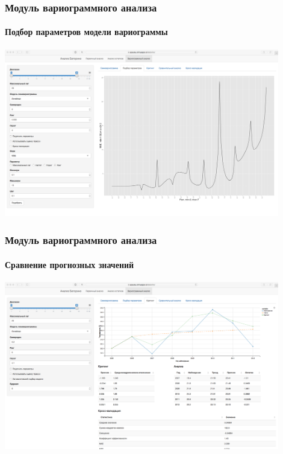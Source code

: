\documentclass{beamer}
\begin{document}
\begin{frame}
  \frametitle{Модуль вариограммного анализа}
  \framesubtitle{Подбор параметров модели вариограммы}
  \begin{center}
    \includegraphics[width=0.9\textwidth]{../../figures/static/5_fit.png}
  \end{center}
\end{frame}

\begin{frame}
  \frametitle{Модуль вариограммного анализа}
  \framesubtitle{Сравнение прогнозных значений}
  \begin{center}
    \includegraphics[width=0.9\textwidth]{../../figures/static/6_krige.png}
  \end{center}
\end{frame}
\end{document}
